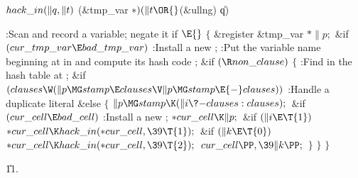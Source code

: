 \Y\B\4\D$\\{hack\_in}(\|q,\|t)$ \5
(\&{tmp\_var} ${}{*})(\|t\OR{}$(\&{ullng}) \|q)\par
\Y\B\4:Scan and record a variable; negate it if \X${}\E{}$%
\6
${}\{{}$\1\6
\&{register} \&{tmp\_var} ${}{*}\|p;{}$\7
\&{if} ${}(\\{cur\_tmp\_var}\E\\{bad\_tmp\_var}){}$\1\5
:Install a new \X;\2\6
:Put the variable name beginning at  in  and compute its hash code \X;\6
\&{if} ${}(\R\\{non\_clause}){}$\5
${}\{{}$\1\6
:Find  in the hash table at \X;\6
\&{if} ${}(\\{clauses}\W(\|p\MG\\{stamp}\E\\{clauses}\V\|p\MG\\{stamp}\E{-}%
\\{clauses})){}$\1\5
:Handle a duplicate literal\X\2\6
\&{else}\5
${}\{{}$\1\6
${}\|p\MG\\{stamp}\K(\|i\?{-}\\{clauses}:\\{clauses});{}$\6
\&{if} ${}(\\{cur\_cell}\E\\{bad\_cell}){}$\1\5
:Install a new \X;\2\6
${}{*}\\{cur\_cell}\K\|p;{}$\6
\&{if} ${}(\|i\E\T{1}){}$\1\5
${}{*}\\{cur\_cell}\K\\{hack\_in}({*}\\{cur\_cell},\39\T{1});{}$\2\6
\&{if} ${}(\|k\E\T{0}){}$\1\5
${}{*}\\{cur\_cell}\K\\{hack\_in}({*}\\{cur\_cell},\39\T{2});{}$\2\6
${}\\{cur\_cell}\PP,\39\|k\PP;{}$\6
\4${}\}{}$\2\6
\4${}\}{}$\2\6
\4${}\}{}$\2\par
\U11.\fi

